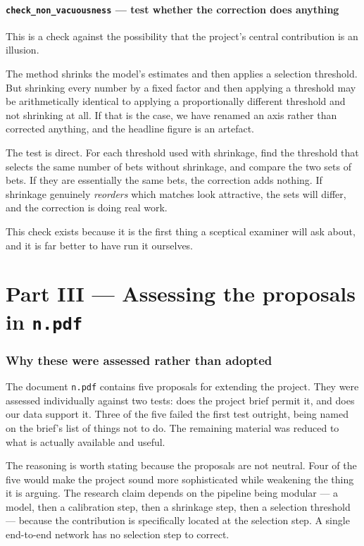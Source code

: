 \documentclass[11pt,a4paper]{article}
\newcommand{\code}[1]{\texttt{#1}}
\begin{document}
\subsection{\code{check\_non\_vacuousness} --- test whether the correction does anything}

This is a check against the possibility that the project's central
contribution is an illusion.

The method shrinks the model's estimates and then applies a selection
threshold. But shrinking every number by a fixed factor and then applying a
threshold may be arithmetically identical to applying a proportionally
different threshold and not shrinking at all. If that is the case, we have
renamed an axis rather than corrected anything, and the headline figure is an
artefact.

The test is direct. For each threshold used with shrinkage, find the threshold
that selects the same number of bets without shrinkage, and compare the two
sets of bets. If they are essentially the same bets, the correction adds
nothing. If shrinkage genuinely \emph{reorders} which matches look attractive,
the sets will differ, and the correction is doing real work.

This check exists because it is the first thing a sceptical examiner will ask
about, and it is far better to have run it ourselves.

\part*{Part III --- Assessing the proposals in \code{n.pdf}}

\section{Why these were assessed rather than adopted}

The document \code{n.pdf} contains five proposals for extending the project.
They were assessed individually against two tests: does the project brief
permit it, and does our data support it. Three of the five failed the first
test outright, being named on the brief's list of things not to do. The
remaining material was reduced to what is actually available and useful.

The reasoning is worth stating because the proposals are not neutral. Four of
the five would make the project sound more sophisticated while weakening the
thing it is arguing. The research claim depends on the pipeline being modular
--- a model, then a calibration step, then a shrinkage step, then a selection
threshold --- because the contribution is specifically located at the
selection step. A single end-to-end network has no selection step to correct.
\end{document}
